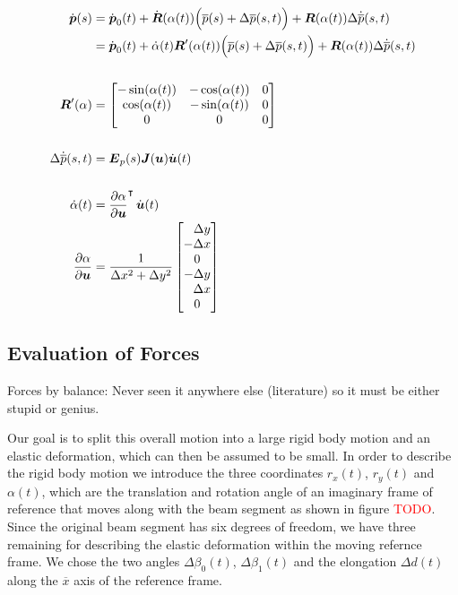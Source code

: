 \begin{align}
\dot{\boldsymbol{p}}(s) &= \dot{\boldsymbol{p}}_0(t) + \dot{\boldsymbol{R}}(\alpha(t))\Big(\overline{p}(s) + \Delta\overline{p}(s, t)\Big) + \boldsymbol{R}(\alpha(t))\Delta\dot{\overline{p}}(s, t) \\
&= \dot{\boldsymbol{p}}_0(t) + \dot{\alpha}(t)\boldsymbol{R}'(\alpha(t))\Big(\overline{p}(s) + \Delta\overline{p}(s, t)\Big) + \boldsymbol{R}(\alpha(t))\Delta\dot{\overline{p}}(s, t) \\
\notag \\
\boldsymbol{R}'(\alpha) &= \begin{bmatrix}
-\sin(\alpha(t)) & -\cos(\alpha(t)) & 0 \\
\cos(\alpha(t)) & -\sin(\alpha(t)) & 0 \\
0 & 0 & 0
\end{bmatrix} \\
\notag \\
\Delta\dot{\overline{p}}(s, t) &= \boldsymbol{E}_{p}(s)\boldsymbol{J}(\boldsymbol{u})\dot{\boldsymbol{u}}(t) \\
\notag \\
\dot{\alpha}(t) &= \frac{\partial\alpha}{\partial\boldsymbol{u}}^\intercal\,\dot{\boldsymbol{u}}(t) \\
\frac{\partial\alpha}{\partial\boldsymbol{u}} &=
\frac{1}{\Delta x^2 + \Delta y^2}
\begin{bmatrix}
\phantom{-}\Delta y \\
-\Delta x \\
0 \\
-\Delta y \\
\phantom{-}\Delta x \\
0
\end{bmatrix}
\end{align}

\newpage
\subsection{Evaluation of Forces}

Forces by balance: Never seen it anywhere else (literature) so it must be either stupid or genius.


\newpage




Our goal is to split this overall motion into a large rigid body motion and an elastic deformation, which can then be assumed to be small.
In order to describe the rigid body motion we introduce the three coordinates $r_x(t)$, $r_y(t)$ and $\alpha(t)$, which are the translation and rotation angle of an imaginary frame of reference that moves along with the beam segment as shown in figure \textcolor{red}{TODO}.
Since the original beam segment has six degrees of freedom, we have three remaining for describing the elastic deformation within the moving refernce frame.
We chose the two angles $\Delta\beta_0(t)$, $\Delta\beta_1(t)$ and the elongation $\Delta d(t)$ along the $\overline{x}$ axis of the reference frame.

